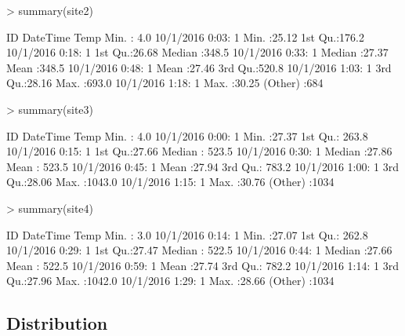 \documentclass{article}
\begin{document}
\begin{Schunk}
\begin{Sinput}
> summary(site2)
\end{Sinput}
\begin{Soutput}
       ID                  DateTime        Temp      
 Min.   :  4.0   10/1/2016 0:03:  1   Min.   :25.12  
 1st Qu.:176.2   10/1/2016 0:18:  1   1st Qu.:26.68  
 Median :348.5   10/1/2016 0:33:  1   Median :27.37  
 Mean   :348.5   10/1/2016 0:48:  1   Mean   :27.46  
 3rd Qu.:520.8   10/1/2016 1:03:  1   3rd Qu.:28.16  
 Max.   :693.0   10/1/2016 1:18:  1   Max.   :30.25  
                 (Other)       :684                  
\end{Soutput}
\end{Schunk}

\begin{Schunk}
\begin{Sinput}
> summary(site3)
\end{Sinput}
\begin{Soutput}
       ID                   DateTime         Temp      
 Min.   :   4.0   10/1/2016 0:00:   1   Min.   :27.37  
 1st Qu.: 263.8   10/1/2016 0:15:   1   1st Qu.:27.66  
 Median : 523.5   10/1/2016 0:30:   1   Median :27.86  
 Mean   : 523.5   10/1/2016 0:45:   1   Mean   :27.94  
 3rd Qu.: 783.2   10/1/2016 1:00:   1   3rd Qu.:28.06  
 Max.   :1043.0   10/1/2016 1:15:   1   Max.   :30.76  
                  (Other)       :1034                  
\end{Soutput}
\end{Schunk}

\begin{Schunk}
\begin{Sinput}
> summary(site4)
\end{Sinput}
\begin{Soutput}
       ID                   DateTime         Temp      
 Min.   :   3.0   10/1/2016 0:14:   1   Min.   :27.07  
 1st Qu.: 262.8   10/1/2016 0:29:   1   1st Qu.:27.47  
 Median : 522.5   10/1/2016 0:44:   1   Median :27.66  
 Mean   : 522.5   10/1/2016 0:59:   1   Mean   :27.74  
 3rd Qu.: 782.2   10/1/2016 1:14:   1   3rd Qu.:27.96  
 Max.   :1042.0   10/1/2016 1:29:   1   Max.   :28.66  
                  (Other)       :1034                  
\end{Soutput}
\end{Schunk}

\subsection{Distribution}
\end{document}

